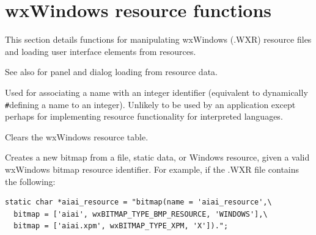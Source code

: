 \section{wxWindows resource functions}\label{resourcefuncs}


This section details functions for manipulating wxWindows (.WXR) resource
files and loading user interface elements from resources.



See also  for panel and dialog
loading from resource data.

\label{wxresourceaddidentifier}


Used for associating a name with an integer identifier (equivalent to dynamically\rtfsp
\verb$#$defining a name to an integer). Unlikely to be used by an application except
perhaps for implementing resource functionality for interpreted languages.



Clears the wxWindows resource table.



Creates a new bitmap from a file, static data, or Windows resource, given a valid
wxWindows bitmap resource identifier. For example, if the .WXR file contains
the following:

\begin{verbatim}
static char *aiai_resource = "bitmap(name = 'aiai_resource',\
  bitmap = ['aiai', wxBITMAP_TYPE_BMP_RESOURCE, 'WINDOWS'],\
  bitmap = ['aiai.xpm', wxBITMAP_TYPE_XPM, 'X']).";
\end{verbatim}

